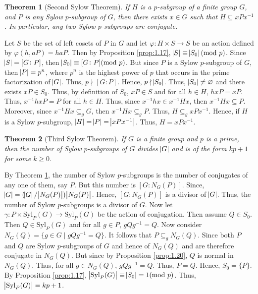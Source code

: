 \documentclass{article}
\makeatletter
\newtheorem{theorem}{Theorem}[section]
\theoremstyle{definition}
\theoremstyle{remark}
\let\oldproofname=\proofname
\renewcommand{\proofname}{\bf{\textit{\oldproofname}}}
\theoremstyle{definition}
\renewenvironment{proof}[1][\proofname]{\par
  \pushQED{\qed}%
  \normalfont \topsep6\p@\@plus6\p@\relax
  \list{}{\leftmargin=0mm
          \rightmargin=0mm
          \settowidth{\itemindent}{\itshape#1}%
          \labelwidth=4mm
          \parsep=0pt \listparindent=0mm%
  }
  \item[\hskip\labelsep
        \itshape
    #1\@addpunct{.}]\ignorespaces
}{%
  \popQED\endlist\@endpefalse
}
\makeatother
\begin{document}
    \begin{theorem}[Second Sylow Theorem]\label{thm:1.5}
        If $H$ is a $p$-subgroup of a finite group $G$, and $P$ is any Sylow $p$-subgroup of $G$, then there exists $x\in G$ such that $H\subseteq xPx^{-1}$. In particular, any two Sylow $p$-subgroups are conjugate.
    \end{theorem}
        \begin{proof}
            Let $S$ be the set of left cosets of $P$ in $G$ and let $\varphi\colon H\times S\rightarrow S$ be an action defined by $\varphi(h,aP)=haP$. Then by Proposition \ref{prop:1.17}, $\abs{S}\equiv\abs{S_0}(\text{mod }p)$. Since $\abs{S}=[G\colon P]$, then $\abs{S_0}\equiv[G\colon P](\text{mod }p)$. But since $P$ is a Sylow $p$-subgroup of $G$, then $\abs{P}=p^n$, where $p^n$ is the highest power of $p$ that occurs in the prime factorization of $\abs{G}$. Thus, $p\nmid[G\colon P]$. Hence, $p\nmid\abs{S_0}$. Thus, $\abs{S_0}\neq\varnothing$ and there exists $xP\in S_0$. Thus, by definition of $S_0$, $xP\in S$ and for all $h\in H$, $hxP=xP$. Thus, $x^{-1}hxP=P$ for all $h\in H$. Thus, since $x^{-1}hx\in x^{-1}Hx$, then $x^{-1}Hx\subseteq P$. Moreover, since $x^{-1}Hx\subseteq_g G$, then $x^{-1}Hx\subseteq_g P$. Thus, $H\subseteq_g xPx^{-1}$. Hence, if $H$ is a Sylow $p$-subgroup, $\abs{H}=\abs{P}=\abs{xPx^{-1}}$. Thus, $H=xPx^{-1}$.
        \end{proof}
        
    \begin{theorem}[Third Sylow Theorem]\label{thm:1.6}
        If $G$ is a finite group and $p$ is a prime, then the number of Sylow $p$-subgroups of $G$ divides $\abs{G}$ and is of the form $kp+1$ for some $k\geq 0$. 
    \end{theorem}
        \begin{proof}
            By Theorem \ref{thm:1.5}, the number of Sylow $p$-subgroups is the number of conjugates of any one of them, say $P$. But this number is $[G\colon N_G(P)]$. Since, $\abs{G}=(\abs{G}/\abs{N_G(P)})\abs{N_G(P)}$. Hence, $[G\colon N_G(P)]$ is a divisor of $\abs{G}$. Thus, the number of Sylow $p$-subgroups is a divisor of $G$. Now let $\gamma\colon P\times\text{Syl}_P(G)\rightarrow\text{Syl}_P(G)$ be the action of conjugation. Then assume $Q\in S_0$. Then $Q\in\text{Syl}_P(G)$ and for all $g\in P$, $gQg^{-1}=Q$. Now consider $N_G(Q)=\{g\in G\mid gQg^{-1}=Q\}$. It follows that $P\subseteq_g N_G(Q)$. Since both $P$ and $Q$ are Sylow $p$-subgroups of $G$ and hence of $N_G(Q)$ and are therefore conjugate in $N_G(Q)$. But since by Proposition \ref{prop:1.20}, $Q$ is normal in $N_G(Q)$. Thus, for all $g\in N_G(Q)$, $gQg^{-1}=Q$. Thus, $P=Q$. Hence, $S_0=\{P\}$. By Proposition \ref{prop:1.17}, $\abs{\text{Syl}_P(G)}\equiv\abs{S_0}=1(\text{mod }p)$. Thus, $\abs{\text{Syl}_P(G)}=kp+1$.
        \end{proof}
        
\end{document}
